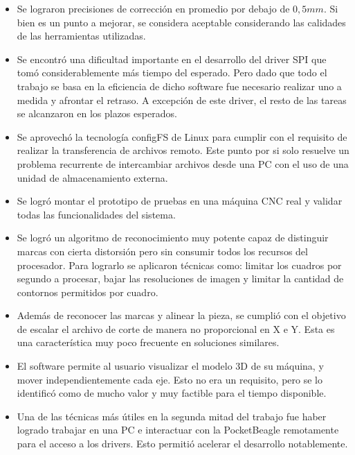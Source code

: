 \begin{itemize}
   \item{Se lograron precisiones de corrección en promedio por debajo de $0,5mm$. Si bien es un punto a mejorar, se considera aceptable considerando las calidades de las herramientas utilizadas.}

   \item{Se encontró una dificultad importante en el desarrollo del driver SPI que tomó considerablemente más tiempo del esperado. Pero dado que todo el trabajo se basa en la eficiencia de dicho software fue necesario realizar uno a medida y afrontar el retraso. A excepción de este driver, el resto de las tareas se alcanzaron en los plazos esperados.}
   
   \item{Se aprovechó la tecnología configFS de Linux para cumplir con el requisito de realizar la transferencia de archivos remoto. Este punto por si solo resuelve un problema recurrente de intercambiar archivos desde una PC con el uso de una unidad de almacenamiento externa.}

   \item{Se logró montar el prototipo de pruebas en una máquina CNC real y validar todas las funcionalidades del sistema.}

   \item{Se logró un algoritmo de reconocimiento muy potente capaz de distinguir marcas con cierta distorsión pero sin consumir todos los recursos del procesador.  Para lograrlo se aplicaron técnicas como: limitar los cuadros por segundo a procesar, bajar las resoluciones de imagen y limitar la cantidad de contornos permitidos por cuadro.}

   \item{Además de reconocer las marcas y alinear la pieza, se cumplió con el objetivo de escalar el archivo de corte de manera no proporcional en X e Y. Esta es una característica muy poco frecuente en soluciones similares.}

   \item{El software permite al usuario visualizar el modelo 3D de su máquina, y mover independientemente cada eje. Esto no era un requisito, pero se lo identificó como de mucho valor y muy factible para el tiempo disponible.}

   \item{Una de las técnicas más útiles en la segunda mitad del trabajo fue haber logrado trabajar en una PC e interactuar con la PocketBeagle remotamente para el acceso a los drivers. Esto permitió acelerar el desarrollo notablemente.}

\end{itemize}



